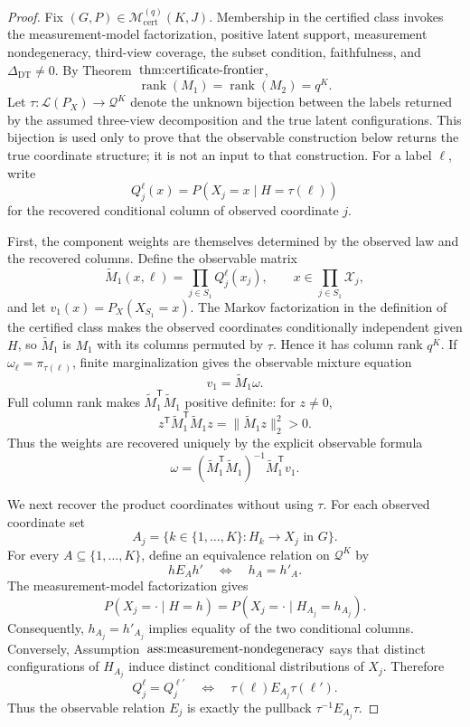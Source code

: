 \documentclass{article}
\begin{document}
\begin{proof}
Fix \((G,P)\in\mathcal M_{\mathrm{cert}}^{(q)}(K,J)\).  Membership in the certified class invokes the measurement-model factorization, positive latent support, measurement nondegeneracy, third-view coverage, the subset condition, faithfulness, and \(\Delta_{\mathrm{DT}}\ne0\).  By Theorem~\(\textnormal{thm:certificate-frontier}\),
\[
 \operatorname{rank}(M_1)=\operatorname{rank}(M_2)=q^K.
\]
Let \(\tau:\mathscr L(P_X)\to\mathcal Q^K\) denote the unknown bijection between the labels returned by the assumed three-view decomposition and the true latent configurations.  This bijection is used only to prove that the observable construction below returns the true coordinate structure; it is not an input to that construction.  For a label \(\ell\), write
\[
 Q_j^\ell(x)=P\!\left(X_j=x\mid H=\tau(\ell)\right)
\]
for the recovered conditional column of observed coordinate \(j\).

First, the component weights are themselves determined by the observed law and the recovered columns.  Define the observable matrix
\[
 \widetilde M_1(x,\ell)=\prod_{j\in S_1}Q_j^\ell(x_j),
 \qquad x\in\prod_{j\in S_1}\mathcal X_j,
\]
and let \(v_1(x)=P_X(X_{S_1}=x)\).  The Markov factorization in the definition of the certified class makes the observed coordinates conditionally independent given \(H\), so \(\widetilde M_1\) is \(M_1\) with its columns permuted by \(\tau\).  Hence it has column rank \(q^K\).  If \(\omega_\ell=\pi_{\tau(\ell)}\), finite marginalization gives the observable mixture equation
\[
 v_1=\widetilde M_1\omega.
\]
Full column rank makes \(\widetilde M_1^{\mathsf T}\widetilde M_1\) positive definite: for \(z\ne0\),
\[
 z^{\mathsf T}\widetilde M_1^{\mathsf T}\widetilde M_1z
 =\lVert\widetilde M_1z\rVert_2^2>0.
\]
Thus the weights are recovered uniquely by the explicit observable formula
\[
 \omega
 =\left(\widetilde M_1^{\mathsf T}\widetilde M_1\right)^{-1}
   \widetilde M_1^{\mathsf T}v_1.
\]

We next recover the product coordinates without using \(\tau\).  For each observed coordinate set
\[
 A_j=\{k\in\{1,\ldots,K\}:H_k\to X_j\text{ in }G\}.
\]
For every \(A\subseteq\{1,\ldots,K\}\), define an equivalence relation on \(\mathcal Q^K\) by
\[
 h\mathrel{E_A}h'
 \quad\Longleftrightarrow\quad h_A=h'_A.
\]
The measurement-model factorization gives
\[
 P(X_j=\mathord\cdot\mid H=h)
 =P(X_j=\mathord\cdot\mid H_{A_j}=h_{A_j}).
\]
Consequently, \(h_{A_j}=h'_{A_j}\) implies equality of the two conditional columns.  Conversely, Assumption~\(\textnormal{ass:measurement-nondegeneracy}\) says that distinct configurations of \(H_{A_j}\) induce distinct conditional distributions of \(X_j\).  Therefore
\[
 Q_j^\ell=Q_j^{\ell'}
 \quad\Longleftrightarrow\quad
 \tau(\ell)\mathrel{E_{A_j}}\tau(\ell').
\]
Thus the observable relation \(E_j\) is exactly the pullback \(\tau^{-1}E_{A_j}\tau\).


\end{proof}
\end{document}

